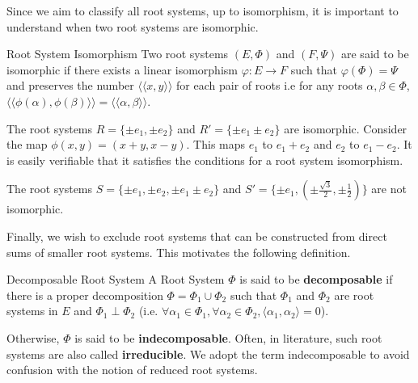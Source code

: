 Since we aim to classify all root systems, up to isomorphism, it is important to understand when two root systems are
isomorphic. \newline

\begin{nameddefinition}{Root System Isomorphism}
    Two root systems $(E, \Phi)$ and $(F,\Psi)$ are said to be isomorphic if there exists a linear isomorphism
    $\varphi: E \to F$ such that $\varphi(\Phi) = \Psi$
    and preserves the number $\langle \langle x, y \rangle \rangle$ for each pair of roots i.e 
    for any roots $\alpha, \beta \in \Phi$, $\langle \langle \phi(\alpha), \phi(\beta) \rangle \rangle = \langle \langle \alpha, \beta \rangle \rangle$.
\end{nameddefinition}

\begin{example}
    The root systems $R = \{ \pm e_1, \pm e_2 \} $ and $R' = \{ \pm e_1 \pm e_2 \}$ are isomorphic. 
    Consider the map $\phi(x, y) = (x + y, x-y)$. This maps $e_1$ to $e_1 + e_2$ and $e_2$ to $e_1 - e_2$.
    It is easily verifiable that it satisfies the conditions for a root system isomorphism.
\end{example}



\begin{example}
    The root systems
    $S = \{ \pm e_1, \pm e_2, \pm e_1 \pm e_2 \} $ and
    $S' = \{ \pm e_1, (\pm \frac{\sqrt{3}}{2}, \pm \frac{1}{2}) \}$ are not isomorphic.
\end{example}

Finally, we wish to exclude root systems that can be constructed from direct sums of smaller root systems.
This motivates the following definition. \newline

\begin{nameddefinition}{Decomposable Root System}
    A Root System $\Phi$ is said to be \textbf{decomposable} if there is a proper decomposition
    $\Phi = \Phi_1 \cup \Phi_2$ such that $\Phi_1$ and $\Phi_2$ are root systems in $E$ and $\Phi_1 \perp \Phi_2$ (i.e. 
    $\forall \alpha_1 \in \Phi_1 , \forall \alpha_2 \in \Phi_2,  \langle \alpha_1, \alpha_2 \rangle = 0$). \newline 

    Otherwise, $\Phi$ is said to be \textbf{indecomposable}. 
    Often, in literature, such root systems are also called \textbf{irreducible}.
    We adopt the term indecomposable to avoid confusion with the notion of reduced root systems.
\end{nameddefinition}

